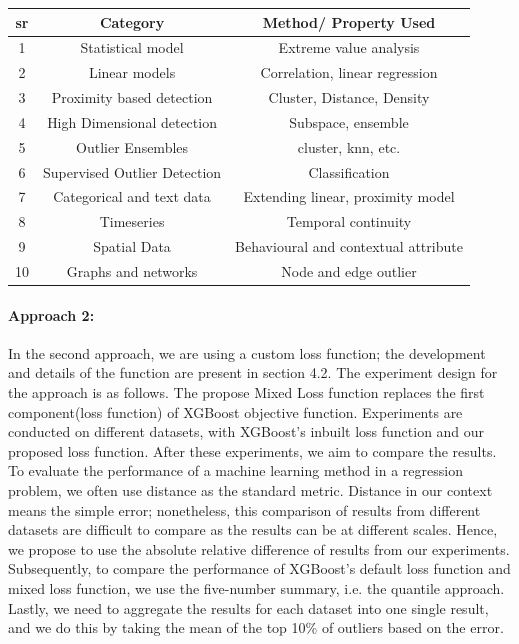 \documentclass[runningheads]{llncs}
\begin{document}
\begin{minipage}[b]{\textwidth}
    \centering
    \begin{tabular}{ccc}\hline
       
      sr	&	Category	&	Method/ Property Used \\
      \hline
    1	&	Statistical model	&	Extreme value analysis \\
    \hline
    2	&	Linear models 	&	Correlation, linear regression \\
    \hline
    3	&	Proximity based detection	&	Cluster, Distance, Density \\
    \hline
    4	&	High Dimensional detection	&	Subspace, ensemble \\
    \hline
    5	&	Outlier Ensembles	&	cluster, knn, etc. \\
    \hline
    6	&	Supervised Outlier Detection	&	Classification  \\
    \hline
    7	&	Categorical and text data	&	Extending linear, proximity model \\
    \hline
    8	&	Timeseries	&	Temporal continuity \\
    \hline
    9	&	Spatial Data	&	Behavioural and contextual attribute \\
    \hline
    10	&	Graphs and networks	&	Node and edge outlier \\
    \hline
    \end{tabular}
\end{minipage}

\paragraph{Approach 2:} In the second approach, we are using a custom loss function; the development and details of the function are present in section 4.2.  The experiment design for the approach is as follows. The propose Mixed Loss function replaces the first component(loss function) of XGBoost objective function. Experiments are conducted on different datasets, with XGBoost's inbuilt loss function and our proposed loss function. After these experiments, we aim to compare the results. To evaluate the performance of a machine learning method in a regression problem, we often use distance as the standard metric. Distance in our context means the simple error; nonetheless, this comparison of results from different datasets are difficult to compare as the results can be at different scales. Hence, we propose to use the absolute relative difference of results from our experiments. Subsequently, to compare the performance of XGBoost's default loss function and mixed loss function, we use the five-number summary, i.e. the quantile approach. Lastly, we need to aggregate the results for each dataset into one single result, and we do this by taking the mean of the top 10\% of outliers based on the error.
\end{document}
